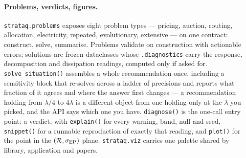 \paragraph{Problems, verdicts, figures.} \texttt{strataq.problems} exposes eight
problem types --- pricing, auction, routing, allocation, electricity, repeated,
evolutionary, extensive --- on one contract: construct, solve, summarise.
Problems validate on construction with actionable errors; solutions are frozen
dataclasses whose \texttt{.diagnostics} carry the response, decomposition and
dissipation readings, computed only if asked for. \texttt{solve\_situation()}
assembles a whole recommendation once, including a sensitivity block that
re-solves across a ladder of precisions and reports what fraction of it agrees
and where the answer first changes --- a recommendation holding from $\lambda/4$
to $4\lambda$ is a different object from one holding only at the $\lambda$ you
picked, and the API says which one you have. \texttt{diagnose()} is the one-call
entry point: a verdict, with \texttt{explain()} for every warning, band, null and
seed, \texttt{snippet()} for a runnable reproduction of exactly that reading, and
\texttt{plot()} for the point in the $(\mathcal{R},\sigma_{\mathrm{EP}})$ plane. \texttt{strataq.viz}
carries one palette shared by library, application and papers.
